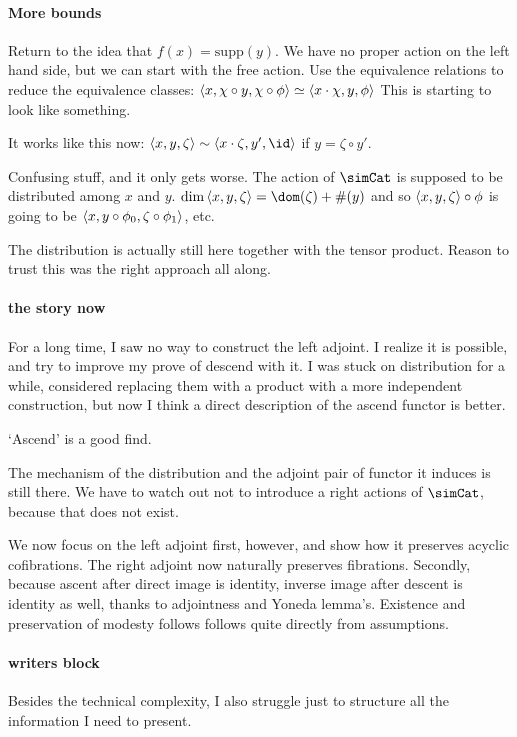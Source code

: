 \documentclass[csh.tex]{subfiles}
\begin{document}
\paragraph{More bounds}
Return to the idea that $f(x) = \mathrm{supp}(y)$. We have no proper action on the left hand side, but we can start with the free action. Use the equivalence relations to reduce the equivalence classes:
$\left\langle x,\chi \circ y,\chi\circ\phi \right\rangle\simeq \left\langle x\cdot \chi,y,\phi \right\rangle$
This is starting to look like something.

It works like this now: $\tuplet{x,y,\zeta}\sim \tuplet{x\cdot\zeta,y',\id}$ if $y = \zeta\circ y'$.

Confusing stuff, and it only gets worse. The action of $\simCat$ is supposed to be distributed among $x$ and $y$. $\dim\tuplet{x,y,\zeta} = \dom(\zeta) + \#(y)$ and so $\left\langle x,y,\zeta \right\rangle\circ\phi$ is going to be $\left\langle x,y\circ \phi_0,\zeta\circ\phi_1 \right\rangle$, etc.

The distribution is actually still here together with the tensor product. Reason to trust this was the right approach all along.

\paragraph{the story now}
For a long time, I saw no way to construct the left adjoint.
I realize it is possible, and try to improve my prove of descend with it. I was stuck on distribution for a while, considered replacing them
with a product with a more independent construction, but now I think a direct description of the ascend functor is better.

`Ascend' is a good find.

The mechanism of the distribution and the adjoint pair of functor it induces is still there. We have to watch out not to introduce a right actions of $\simCat$, because that does not exist.

We now focus on the left adjoint first, however, and show how it preserves acyclic cofibrations. The right adjoint now naturally preserves fibrations. Secondly, because ascent after direct image is identity, inverse image after descent is identity as well, thanks to adjointness and Yoneda lemma's. Existence and preservation of modesty follows follows quite directly from assumptions.

\paragraph{writers block} Besides the technical complexity, I also struggle just to structure all the information I need to present.
\end{document}
